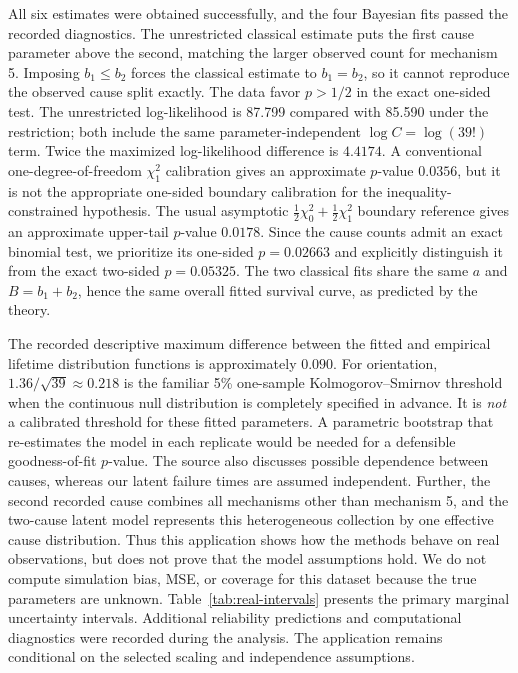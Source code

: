 \documentclass[a4paper,11pt]{article}
\begin{document}
All six estimates were obtained successfully, and the four Bayesian fits passed the recorded diagnostics. The unrestricted classical estimate puts the first cause parameter above the second, matching the larger observed count for mechanism 5. Imposing $b_1\le b_2$ forces the classical estimate to $b_1=b_2$, so it cannot reproduce the observed cause split exactly. The data favor $p>1/2$ in the exact one-sided test. The unrestricted log-likelihood is 87.799 compared with 85.590 under the restriction; both include the same parameter-independent $\log C=\log(39!)$ term. Twice the maximized log-likelihood difference is $4.4174$. A conventional one-degree-of-freedom $\chi^2_1$ calibration gives an approximate $p$-value $0.0356$, but it is not the appropriate one-sided boundary calibration for the inequality-constrained hypothesis. The usual asymptotic $\tfrac12\chi^2_0+\tfrac12\chi^2_1$ boundary reference gives an approximate upper-tail $p$-value $0.0178$. Since the cause counts admit an exact binomial test, we prioritize its one-sided $p=0.02663$ and explicitly distinguish it from the exact two-sided $p=0.05325$. The two classical fits share the same $a$ and $B=b_1+b_2$, hence the same overall fitted survival curve, as predicted by the theory.

The recorded descriptive maximum difference between the fitted and empirical lifetime distribution functions is approximately $0.090$. For orientation, $1.36/\sqrt{39}\approx0.218$ is the familiar 5\% one-sample Kolmogorov--Smirnov threshold when the continuous null distribution is completely specified in advance. It is \emph{not} a calibrated threshold for these fitted parameters. A parametric bootstrap that re-estimates the model in each replicate would be needed for a defensible goodness-of-fit $p$-value. The source also discusses possible dependence between causes, whereas our latent failure times are assumed independent. Further, the second recorded cause combines all mechanisms other than mechanism 5, and the two-cause latent model represents this heterogeneous collection by one effective cause distribution. Thus this application shows how the methods behave on real observations, but does not prove that the model assumptions hold. We do not compute simulation bias, MSE, or coverage for this dataset because the true parameters are unknown. Table~\ref{tab:real-intervals} presents the primary marginal uncertainty intervals. Additional reliability predictions and computational diagnostics were recorded during the analysis. The application remains conditional on the selected scaling and independence assumptions.
\end{document}
